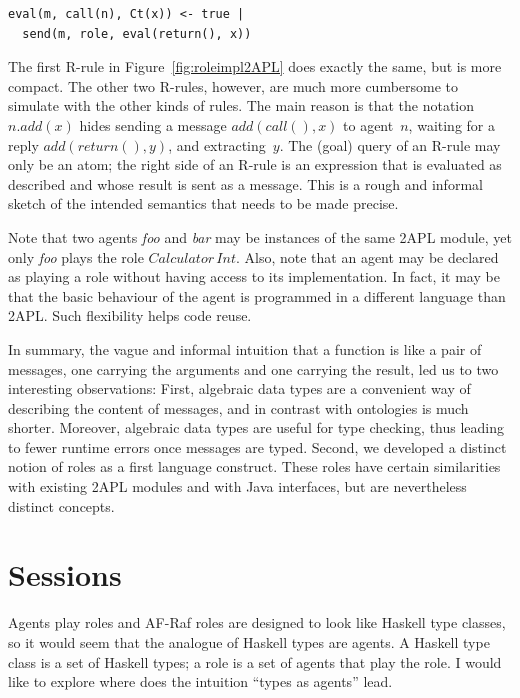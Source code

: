 \documentclass[a4paper,12pt,oneside,fleqn]{book} %
\newcommand{\todo}[1]{[\textcolor{red}{TODO}: #1]}
\begin{document}
{\begin{verbatim}
eval(m, call(n), Ct(x)) <- true |
  send(m, role, eval(return(), x))
\end{verbatim}

The first R-rule in Figure~\ref{fig:roleimpl2APL} does exactly the same,
but is more compact. The other two R-rules, however, are much more
cumbersome to simulate with the other kinds of rules. The main reason is
that the notation $n.\mathit{add}(x)$ hides sending a message
$\mathit{add}(\mathit{call}(),x)$ to agent~$n$, waiting for a reply
$\mathit{add}(\mathit{return}(),y)$, and extracting~$y$. The (goal) query
of an R-rule may only be an atom; the right side of an R-rule is an
expression that is evaluated as described and whose result is sent as a
message.  This is a rough and informal sketch of the intended semantics
that needs to be made precise.

Note that two agents \textit{foo} and \textit{bar} may be instances of the
same 2APL module, yet only \textit{foo} plays the role
$\mathit{Calculator}\,\mathit{Int}$. Also, note that an agent may be
declared as playing a role without having access to its implementation. In
fact, it may be that the basic behaviour of the agent is programmed in a
different language than 2APL. Such flexibility helps code reuse.

In summary, the vague and informal intuition that a function is like a pair
of messages, one carrying the arguments and one carrying the result, led us
to two interesting observations: First, algebraic data types are a
convenient way of describing the content of messages, and in contrast with
ontologies is much shorter. Moreover, algebraic data types are useful for
type checking, thus leading to fewer runtime errors once messages are
typed. Second, we developed a distinct notion of roles as a first language
construct. These roles have certain similarities with existing 2APL modules
and with Java interfaces, but are nevertheless distinct concepts.


\section{Sessions}\label{sec:sessions} %

Agents play roles and AF-Raf roles are designed to look like Haskell type
classes, so it would seem that the analogue of Haskell types are
agents. A Haskell type class is a set of Haskell types; a role is a
set of agents that play the role. I would like to explore where
does the intuition ``types as agents'' lead.

}
\end{document}
